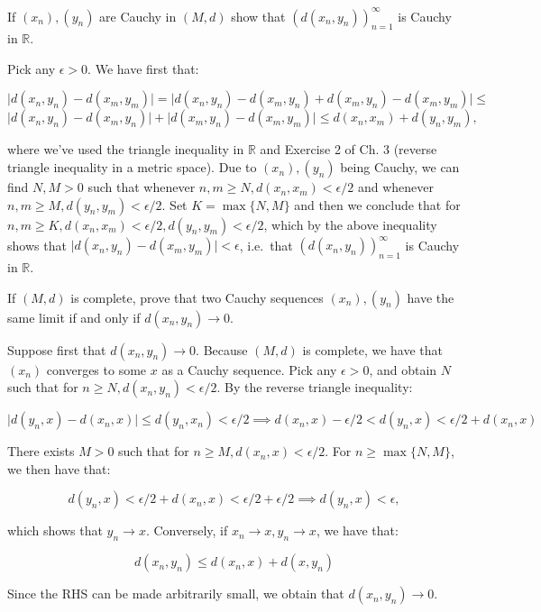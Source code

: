 \begin{exercise}{20}
    If $(x_n), (y_n)$ are Cauchy in $(M, d)$ show that $(d(x_n, y_n))_{n=1}^{\infty}$ is Cauchy in $\mathbb{R}$.
\end{exercise}

\begin{solution}
    
    Pick any $\epsilon > 0$.
    We have first that:
    
    \[\lvert d(x_n, y_n) - d(x_m, y_m) \rvert = \lvert d(x_n, y_n) - d(x_m, y_n) + d(x_m, y_n) - d(x_m, y_m) \rvert \leq \]
    \[\lvert d(x_n, y_n) - d(x_m, y_n) \rvert + \lvert d(x_m, y_n) - d(x_m, y_m) \rvert \leq d(x_n, x_m) + d(y_n, y_m),\]

    where we've used the triangle inequality in $\mathbb{R}$ and Exercise 2 of Ch. 3 (reverse triangle inequality in a metric space).
    Due to $(x_n), (y_n)$ being Cauchy, we can find $N, M > 0$ such that whenever $n, m \geq N, d(x_n, x_m) < \epsilon/2$ and whenever $n, m \geq M, d(y_n, y_m) < \epsilon/2$.
    Set $K = \max\{N, M\}$ and then we conclude that for $n, m \geq K, d(x_n, x_m) < \epsilon/2, d(y_n, y_m) < \epsilon/2$, which by the above inequality shows that $\lvert d(x_n, y_n) - d(x_m, y_m) \rvert < \epsilon$, i.e.\, that $(d(x_n, y_n))_{n=1}^{\infty}$ is Cauchy in $\mathbb{R}$.
\end{solution}

\begin{exercise}{21}
    If $(M, d)$ is complete, prove that two Cauchy sequences $(x_n), (y_n)$ have the same limit if and only if $d(x_n, y_n) \rightarrow 0$.
\end{exercise}

\begin{solution}
    
    Suppose first that $d(x_n, y_n) \rightarrow 0$.
    Because $(M, d)$ is complete, we have that $(x_n)$ converges to some $x$ as a Cauchy sequence.    
    Pick any $\epsilon > 0$, and obtain $N$ such that for $n \geq N, d(x_n, y_n) < \epsilon/2$.
    By the reverse triangle inequality:

    \[\lvert d(y_n, x) - d(x_n, x) \rvert \leq d(y_n, x_n) < \epsilon/2 \implies d(x_n, x) - \epsilon/2 < d(y_n, x) < \epsilon/2 + d(x_n, x)\]
    
    There exists $M > 0$ such that for $n \geq M, d(x_n, x) < \epsilon/2$.
    For $n \geq \max\{N, M\}$, we then have that:

    \[d(y_n, x) < \epsilon/2 + d(x_n, x) < \epsilon/2 + \epsilon/2 \implies d(y_n, x) < \epsilon,\]

    which shows that $y_n \rightarrow x$.
    Conversely, if $x_n \rightarrow x, y_n \rightarrow x$, we have that:

    \[d(x_n, y_n) \leq d(x_n, x) + d(x, y_n)\]

    Since the RHS can be made arbitrarily small, we obtain that $d(x_n, y_n) \rightarrow 0$.
\end{solution}

